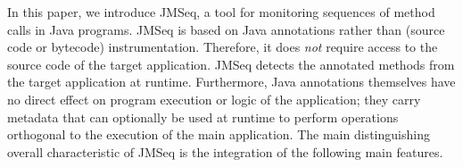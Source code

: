 In this paper, we introduce JMSeq, a tool for monitoring  sequences of method calls in Java programs.
JMSeq is based on Java annotations rather than (source code or bytecode) instrumentation. 
Therefore, it does \emph{not} require  access to the source code of the target application.
JMSeq detects the annotated methods from the target application at runtime. 
Furthermore,  Java annotations themselves have no direct effect on program execution or logic of the application;
they carry metadata that can optionally be used at runtime to perform operations orthogonal to the execution of the main application.
The main distinguishing overall characteristic of JMSeq is
the integration of the following main features.

